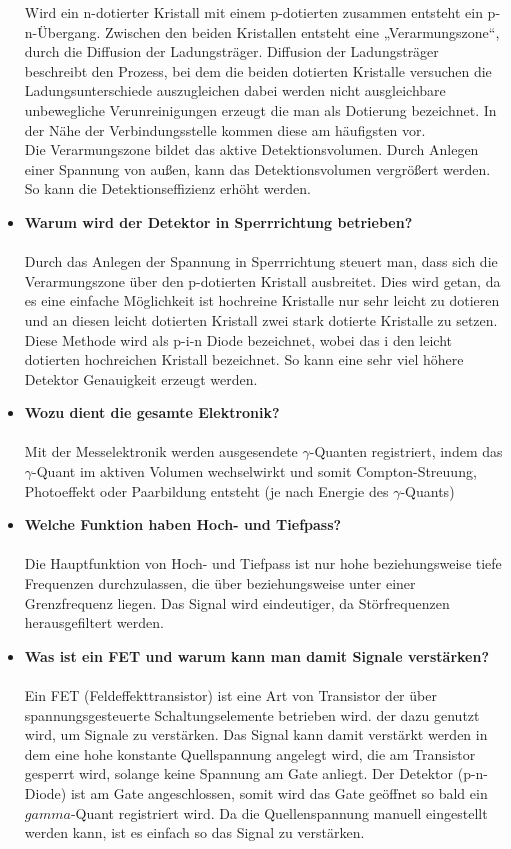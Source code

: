 \documentclass{article}
\begin{document}
\begin{itemize}
	Wird ein n-dotierter Kristall mit einem p-dotierten zusammen entsteht ein p-n-Übergang. Zwischen den beiden Kristallen entsteht eine „Verarmungszone“, durch die Diffusion der Ladungsträger. Diffusion der Ladungsträger beschreibt den Prozess, bei dem die beiden dotierten Kristalle versuchen die Ladungsunterschiede auszugleichen dabei werden nicht ausgleichbare unbewegliche Verunreinigungen erzeugt die man als Dotierung bezeichnet. In der Nähe der Verbindungsstelle kommen diese am häufigsten vor. \\
	Die Verarmungszone bildet das aktive Detektionsvolumen. Durch Anlegen einer Spannung von außen, kann das Detektionsvolumen vergrößert werden. So kann die Detektionseffizienz erhöht werden.
	\item \textbf{Warum wird der Detektor in Sperrrichtung betrieben?}\\\\
	Durch das Anlegen der Spannung in Sperrrichtung steuert man, dass sich die Verarmungszone über den p-dotierten Kristall ausbreitet. Dies wird getan, da es eine einfache Möglichkeit ist hochreine Kristalle nur sehr leicht zu dotieren und an diesen leicht dotierten Kristall zwei stark dotierte Kristalle zu setzen. Diese Methode wird als p-i-n Diode bezeichnet, wobei das i den leicht dotierten hochreichen Kristall bezeichnet.
	So kann eine sehr viel höhere Detektor Genauigkeit erzeugt werden.
	\item \textbf{Wozu dient die gesamte Elektronik?}\\\\
	Mit der Messelektronik werden ausgesendete $\gamma$-Quanten registriert, indem das $\gamma$-Quant im aktiven Volumen wechselwirkt und somit Compton-Streuung, Photoeffekt oder Paarbildung entsteht (je nach Energie des $\gamma$-Quants)
	\item \textbf{Welche Funktion haben Hoch- und Tiefpass?}\\\\
	Die Hauptfunktion von Hoch- und Tiefpass ist nur hohe beziehungsweise tiefe Frequenzen durchzulassen, die über beziehungsweise unter einer Grenzfrequenz liegen. Das Signal wird eindeutiger, da Störfrequenzen herausgefiltert werden.
	\item \textbf{Was ist ein FET und warum kann man damit Signale verstärken?}\\\\
	Ein FET (Feldeffekttransistor) ist eine Art von Transistor der über spannungsgesteuerte Schaltungselemente betrieben wird. der dazu genutzt wird, um Signale zu verstärken. Das Signal kann damit verstärkt werden in dem eine hohe konstante Quellspannung angelegt wird, die am Transistor gesperrt wird, solange keine Spannung am Gate anliegt. Der Detektor (p-n-Diode) ist am Gate angeschlossen, somit wird das Gate geöffnet so bald ein $gamma$-Quant registriert wird. Da die Quellenspannung manuell eingestellt werden kann, ist es einfach so das Signal zu verstärken.

\end{itemize}
\end{document}
